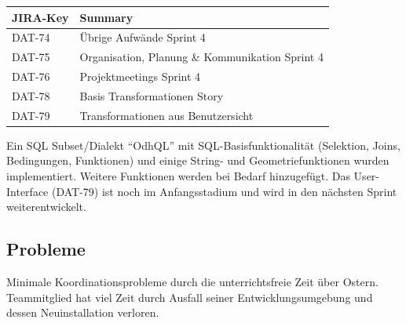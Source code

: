 \begin{table}[H]	
\centering
\begin{tabular}{ll}
	\toprule
	\textbf{JIRA-Key} & \textbf{Summary}\\
	\midrule
DAT-74 & Übrige Aufwände Sprint 4\\
DAT-75 & Organisation, Planung \& Kommunikation Sprint 4\\
DAT-76 & Projektmeetings Sprint 4\\
DAT-78 & Basis Transformationen	Story\\
DAT-79 & Transformationen aus Benutzersicht\\
	\bottomrule
\end{tabular}	
\end{table}

Ein SQL Subset/Dialekt ``OdhQL'' mit SQL-Basisfunktionalität (Selektion, Joins, Bedingungen, Funktionen) und einige String- und Geometriefunktionen wurden implementiert. Weitere Funktionen werden bei Bedarf hinzugefügt. Das User-Interface (DAT-79) ist noch im Anfangsstadium und wird in den nächsten Sprint weiterentwickelt.

\subsection{Probleme}
Minimale Koordinationsprobleme durch die unterrichtsfreie Zeit über Ostern. Teammitglied \rlif hat viel Zeit durch Ausfall seiner Entwicklungsumgebung und dessen Neuinstallation verloren.
